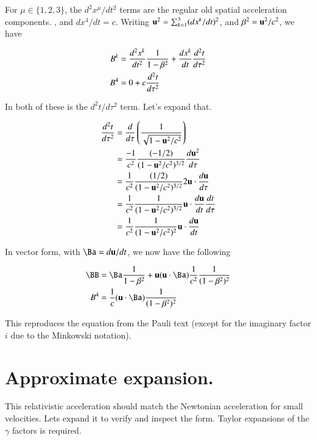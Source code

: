 For $\mu \in \{1,2,3\}$, the ${d^2 x^\mu }/{dt^2}$ terms are the regular old spatial acceleration components.
, and $dx^4/dt = c$.  Writing $\mathbf{u}^2 = \sum_{k=1}^3 (dx^k/dt)^2$, and $\beta^2 = \mathbf{u}^2/c^2$, we have

\begin{align*}
B^k &= \frac{d^2 x^k }{dt^2} \frac{1}{1-\beta^2} + \frac{d x^k }{dt} \frac{d^2t}{d\tau^2} \\
B^4 &= 0 + c \frac{d^2t}{d\tau^2} \\
\end{align*}

In both of these is the $d^2t/d\tau^2$ term.  Let's expand that.

\begin{align*}
\frac{d^2t}{d\tau^2} 
&= \frac{d}{d\tau} \left( \frac{1}{\sqrt{ 1 - \mathbf{u}^2/c^2 }} \right) \\
&= \frac{-1}{c^2} \frac{(-1/2) }{({ 1 - \mathbf{u}^2/c^2 })^{3/2}} \frac{d\mathbf{u}^2}{d\tau} \\
&= \frac{1}{c^2} \frac{(1/2) }{({ 1 - \mathbf{u}^2/c^2 })^{3/2}} 2 \mathbf{u} \cdot \frac{d\mathbf{u}}{d\tau} \\
&= \frac{1}{c^2} \frac{1}{({ 1 - \mathbf{u}^2/c^2 })^{3/2}} \mathbf{u} \cdot \frac{d\mathbf{u}}{dt} \frac{dt}{d\tau} \\
&= \frac{1}{c^2} \frac{1}{({ 1 - \mathbf{u}^2/c^2 })^{2}} \mathbf{u} \cdot \frac{d\mathbf{u}}{dt} \\
\end{align*}

In vector form, with $\Ba = d\Bu/dt$, we now have the following 

\begin{align}\label{eqn:accSpaceTimeSplit}
\BB &= \Ba \inv{1-\beta^2} + \Bu (\Bu \cdot \Ba) \inv{c^2} \inv{ (1-\beta^2)^2} \\
B^4 &= \inv{c} (\Bu \cdot \Ba) \inv{ (1-\beta^2)^2}
\end{align}

This reproduces the equation from the Pauli text (except for the imaginary factor $i$ due to the Minkowski notation).

\section{Approximate expansion. }

This relativistic acceleration should match the Newtonian acceleration for small velocities.  Lets expand it to verify and inspect the form.  Taylor expansions of the $\gamma$ factors is required.

